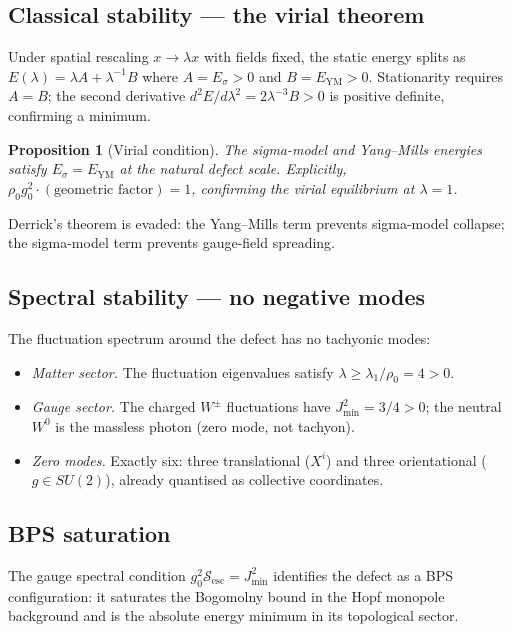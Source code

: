 \documentclass[12pt]{article}
\newtheorem{proposition}[theorem]{Proposition}
\theoremstyle{definition}
\theoremstyle{remark}
\begin{document}
\subsection{Classical stability — the virial theorem}

Under spatial rescaling $x\to\lambda x$ with fields fixed, the static energy
splits as $E(\lambda)=\lambda A+\lambda^{-1}B$ where $A=E_\sigma>0$ and
$B=E_{\mathrm{YM}}>0$.  Stationarity requires $A=B$; the second derivative
$d^2E/d\lambda^2=2\lambda^{-3}B>0$ is positive definite, confirming a
minimum.

\begin{proposition}[Virial condition]
The sigma-model and Yang--Mills energies satisfy $E_\sigma=E_{\mathrm{YM}}$
at the natural defect scale.  Explicitly,
$\rho_0 g_0^2\cdot(\text{geometric factor})=1$, confirming the virial
equilibrium at $\lambda=1$.
\end{proposition}

Derrick's theorem is evaded: the Yang--Mills term prevents sigma-model
collapse; the sigma-model term prevents gauge-field spreading.

\subsection{Spectral stability — no negative modes}

The fluctuation spectrum around the defect has no tachyonic modes:
\begin{itemize}
\item \emph{Matter sector.}  The fluctuation eigenvalues satisfy
  $\lambda\geq\lambda_1/\rho_0=4>0$.
\item \emph{Gauge sector.}  The charged $W^\pm$ fluctuations have
  $J^2_{\min}=3/4>0$; the neutral $W^0$ is the massless photon (zero mode,
  not tachyon).
\item \emph{Zero modes.}  Exactly six: three translational ($X^i$) and three
  orientational ($g\in SU(2)$), already quantised as collective coordinates.
\end{itemize}

\subsection{BPS saturation}

The gauge spectral condition $g_0^2\mathcal{S}_{\mathrm{esc}}=J^2_{\min}$
identifies the defect as a BPS configuration: it saturates the Bogomolny
bound in the Hopf monopole background and is the absolute energy minimum
in its topological sector.
\end{document}
